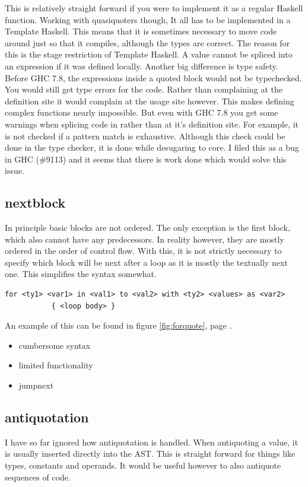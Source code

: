 \documentclass[a4paper,bibliography=totocnumbered,parskip,headsepline]{scrbook}
\begin{document}
This is relatively straight forward if you were to implement it as a regular Haskell function.
Working with quasiquoters though, It all has to be implemented in a Template Haskell.
This means that it is sometimes necessary to move code around just so that it compiles, although the types are correct.
The reason for this is the stage restriction of Template Haskell.
A value cannot be spliced into an expression if it was defined locally.
Another big difference is type safety.
Before GHC 7.8, the expressions inside a quoted block would not be typechecked.
You would still get type errors for the code.
Rather than complaining at the definition site it would complain at the usage site however.
This makes defining complex functions nearly impossible.
But even with GHC 7.8 you get some warnings when splicing code in rather than at it's definition site.
For example, it is not checked if a pattern match is exhaustive.
Although this check could be done in the type checker, it is done while desugaring to core.
I filed this as a bug in GHC (\#9113) and it seems that there is work done which would solve this issue.

\subsection{nextblock}
In principle basic blocks are not ordered.
The only exception is the first block, which also cannot have any predecessors.
In reality however, they are mostly ordered in the order of control flow.
With this, it is not strictly necessary to specify which block will be next after a loop as it is mostly the textually next one.
This simplifies the syntax somewhat.

\begin{lstlisting}[numbers=none]
for <ty1> <var1> in <val1> to <val2> with <ty2> <values> as <var2>
           { <loop body> }
\end{lstlisting}

An example of this can be found in figure \ref{fig:forquote}, page \pageref{fig:forquote}.

\begin{itemize}
\item cumbersome syntax
\item limited functionality
\item jumpnext
\end{itemize}

\subsection{antiquotation}
I have so far ignored how antiquotation is handled.
When antiquoting a value, it is usually inserted directly into the AST.
This is straight forward for things like types, constants and operands.
It would be useful however to also antiquote sequences of code.
\end{document}
